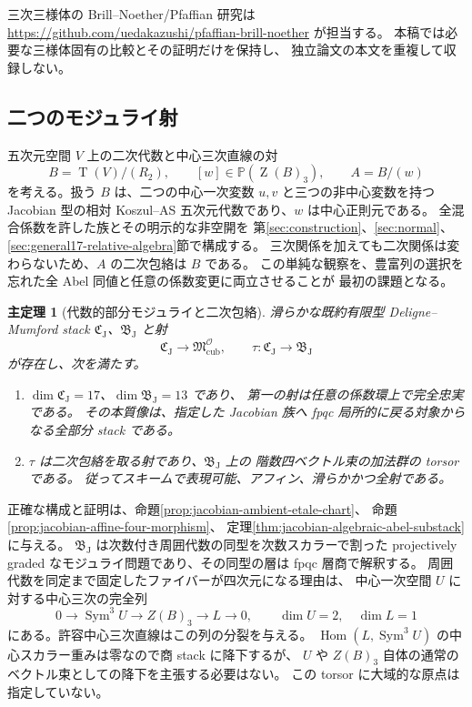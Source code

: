 \documentclass[11pt,a4paper]{ltjsarticle}
\numberwithin{equation}{section}
\newtheorem{maintheorem}{主定理}
\newcommand{\PP}{\mathbb P}
\newcommand{\Sym}{\operatorname{Sym}}
\newcommand{\Hom}{\operatorname{Hom}}
\newcommand{\Z}{\operatorname{Z}}
\newcommand{\Tens}{\operatorname{T}}
\begin{document}
三次三様体の Brill--Noether/Pfaffian 研究は
\url{https://github.com/uedakazushi/pfaffian-brill-noether} が担当する。
本稿では必要な三様体固有の比較とその証明だけを保持し、
独立論文の本文を重複して収録しない。

\subsection{二つのモジュライ射}

五次元空間 $V$ 上の二次代数と中心三次直線の対
\begin{equation}\label{eq:data}
 B=\Tens(V)/(R_2),\qquad [w]\in\PP(\Z(B)_3),\qquad A=B/(w)
\end{equation}
を考える。扱う $B$ は、二つの中心一次変数 $u,v$ と三つの非中心変数を持つ
Jacobian 型の相対 Koszul--AS 五次元代数であり、$w$ は中心正則元である。
全混合係数を許した族とその明示的な非空開を
第\ref{sec:construction}、\ref{sec:normal}、\ref{sec:general17-relative-algebra}節で構成する。
三次関係を加えても二次関係は変わらないため、$A$ の二次包絡は $B$ である。
この単純な観察を、豊富列の選択を忘れた全 Abel 同値と任意の係数変更に両立させることが
最初の課題となる。

\begin{maintheorem}[代数的部分モジュライと二次包絡]\label{thm:intro-atlas}
滑らかな既約有限型 Deligne--Mumford stack
$\mathfrak C_{\mathrm J}$、$\mathfrak B_{\mathrm J}$ と射
\[
 \mathfrak C_{\mathrm J}\longrightarrow\mathfrak M^{\mathcal O}_{\mathrm{cub}},
 \qquad
 \tau:\mathfrak C_{\mathrm J}\longrightarrow\mathfrak B_{\mathrm J}
\]
が存在し、次を満たす。
\begin{enumerate}[label=\textup{(\roman*)}]
\item $\dim\mathfrak C_{\mathrm J}=17$、$\dim\mathfrak B_{\mathrm J}=13$ であり、
第一の射は任意の係数環上で完全忠実である。
その本質像は、指定した Jacobian 族へ fpqc 局所的に戻る対象からなる全部分 stack である。
\item $\tau$ は二次包絡を取る射であり、$\mathfrak B_{\mathrm J}$ 上の
階数四ベクトル束の加法群の torsor である。
従ってスキームで表現可能、アフィン、滑らかかつ全射である。
\end{enumerate}
\end{maintheorem}

正確な構成と証明は、命題\ref{prop:jacobian-ambient-etale-chart}、
命題\ref{prop:jacobian-affine-four-morphism}、
定理\ref{thm:jacobian-algebraic-abel-substack}に与える。
$\mathfrak B_{\mathrm J}$ は次数付き周囲代数の同型を次数スカラーで割った
projectively graded なモジュライ問題であり、その同型の層は fpqc 層商で解釈する。
周囲代数を同定まで固定したファイバーが四次元になる理由は、
中心一次空間 $U$ に対する中心三次の完全列
\[
 0\longrightarrow\Sym^3 U\longrightarrow Z(B)_3\longrightarrow L\longrightarrow0,
 \qquad \dim U=2,\quad\dim L=1
\]
にある。許容中心三次直線はこの列の分裂を与える。
$\Hom(L,\Sym^3 U)$ の中心スカラー重みは零なので商 stack に降下するが、
$U$ や $Z(B)_3$ 自体の通常のベクトル束としての降下を主張する必要はない。
この torsor に大域的な原点は指定していない。
\end{document}
